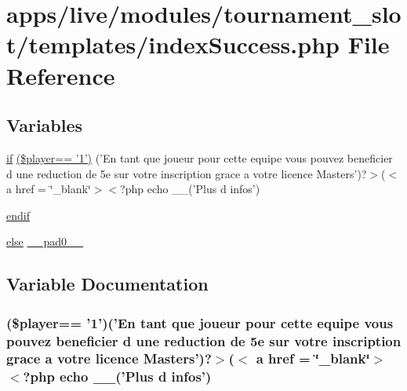 \hypertarget{live_2modules_2tournament__slot_2templates_2index_success_8php}{\section{apps/live/modules/tournament\-\_\-slot/templates/index\-Success.php File Reference}
\label{live_2modules_2tournament__slot_2templates_2index_success_8php}
}
\subsection*{Variables}
\begin{DoxyCompactItemize}
\item 
\hyperlink{live_2modules_2tournament_2templates_2__form_team_8php_ae30a307b320d8da5d9a945eaf68f7549}{if} \hyperlink{live_2modules_2tournament__slot_2templates_2index_success_8php_a2f78261e5cf79134075732b4dea02645}{(\$player== '1')} ('En tant que joueur pour cette equipe vous pouvez beneficier d une reduction de 5e sur votre inscription grace a votre licence Masters')?$>$($<$ a href = \char`\"{}\-\_\-blank\char`\"{}$>$$<$?php echo \-\_\-\-\_\-('Plus d infos')
\item 
\hyperlink{live_2modules_2tournament__slot_2templates_2index_success_8php_ad0f54803f81be8eb0b4f23a5091c4d83}{endif}
\item 
\hyperlink{live_2modules_2team_2templates_2management_success_8php_a0544c3fe466e421738dae463968b70ba}{else} \hyperlink{live_2modules_2tournament__slot_2templates_2index_success_8php_a8e01dcc96c43199448ee66f7c2ae8ea6}{\-\_\-\-\_\-pad0\-\_\-\-\_\-}
\end{DoxyCompactItemize}


\subsection{Variable Documentation}
\hypertarget{live_2modules_2tournament__slot_2templates_2index_success_8php_a2f78261e5cf79134075732b4dea02645}{
\subsubsection[{(\$player== '1')}]{ (\$player== '1')('En tant que joueur pour cette equipe vous pouvez beneficier d une reduction de 5e sur votre inscription grace a votre licence Masters')?$>$($<$ a href = \char`\"{}\-\_\-blank\char`\"{}$>$$<$?php echo \-\_\-\-\_\-('Plus d infos')}}\label{live_2modules_2tournament__slot_2templates_2index_success_8php_a2f78261e5cf79134075732b4dea02645}


